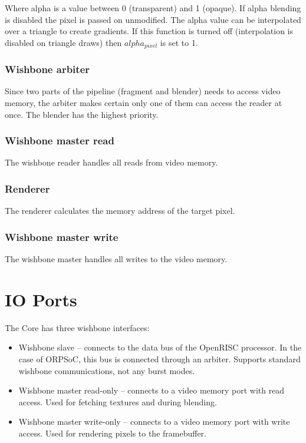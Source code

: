 \documentclass[10pt,a4paper]{article}
\begin{document}
Where alpha is a value between 0 (transparent) and 1 (opaque). If alpha blending is disabled the pixel is passed on unmodified. The alpha value can be interpolated over a triangle to create gradients. If this function is turned off (interpolation is disabled on triangle draws) then $alpha_{pixel}$ is set to 1.

\subsubsection{Wishbone arbiter}
Since two parts of the pipeline (fragment and blender) needs to access video memory, the arbiter makes certain only one of them can access the reader at once. The blender has the highest priority.

\subsubsection{Wishbone master read}
The wishbone reader handles all reads from video memory.

\subsubsection{Renderer}
The renderer calculates the memory address of the target pixel.

\subsubsection{Wishbone master write}
The wishbone master handles all writes to the video memory.

\section{IO Ports}
The Core has three wishbone interfaces:

\begin{itemize}
\item Wishbone slave -- connects to the data bus of the OpenRISC processor. In the case of ORPSoC, this bus is connected through an arbiter. Supports standard wishbone communications, not any burst modes.
\item Wishbone master read-only -- connects to a video memory port with read access. Used for fetching textures and during blending.
\item Wishbone master write-only -- connects to a video memory port with write access. Used for rendering pixels to the framebuffer.
\end{itemize}
\end{document}
